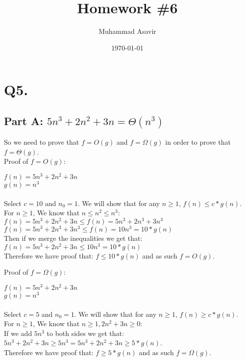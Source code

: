 \documentclass[titlepage]{article}\pagestyle{empty}
\author{Muhammad Asavir}
\title{Homework \#6}
\date{\today}
\begin{document}
\maketitle

\pagebreak
\section*{Q5.}
\subsection*{Part A: $5n^3 + 2n^2 + 3n = \Theta(n^3)$}
So we need to prove that $f = O(g)$ and $f = \Omega(g)$ in order to prove that $f = \Theta(g)$.\\
Proof of $f = O(g)$:
\begin{center}
$f(n) = 5n^3 + 2n^2 + 3n$\\
$g(n) = n^3$\\~\\
Select $c = 10$ and $n_0 = 1$. We will show that for any $n \geq 1$, $f(n) \leq c * g(n).$\\
For $n \geq 1$, We know that $n \leq n^2 \leq n^3$: \\
$f(n) = 5n^3 + 2n^2 + 3n \leq f(n) = 5n^3 + 2n^3 + 3n^3$\\
$f(n) = 5n^3 + 2n^3 + 3n^3 \leq f(n) = 10n^3 = 10 * g(n)$\\
Then if we merge the inequalities we get that:\\
$f(n) = 5n^3 + 2n^2 + 3n \leq 10n^3 = 10 * g(n)$\\
Therefore we have proof that: $f \leq 10 * g(n)$ and as such $f = O(g)$.
\end{center}
Proof of $f = \Omega(g)$:
\begin{center}
$f(n) = 5n^3 + 2n^2 + 3n$\\
$g(n) = n^3$\\~\\
Select $c = 5$ and $n_0 = 1$. We will show that for any $n \geq 1$, $f(n) \geq c * g(n).$\\
For $n \geq 1$, We know that $n \geq 1, 2n^2 + 3n \geq 0$: \\
If we add $5n^3$ to both sides we get that:\\
$5n^3 + 2n^2 + 3n \geq 5n^3 = 5n^3 + 2n^2 + 3n \geq 5 * g(n)$.\\
Therefore we have proof that: $f \geq 5 * g(n)$ and as such $f = \Omega(g)$.\\
\end{center}
\end{document}
